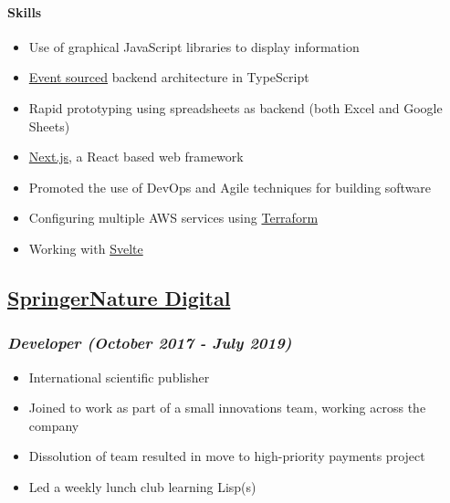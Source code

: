 \hypertarget{skills-0}{%
\paragraph{Skills}\label{skills-0}}

\begin{itemize}
\tightlist
\item
  Use of graphical JavaScript libraries to display information
\item
  \href{https://martinfowler.com/eaaDev/EventSourcing.html}{Event
  sourced} backend architecture in TypeScript
\item
  Rapid prototyping using spreadsheets as backend (both Excel and Google
  Sheets)
\item
  \href{https://nextjs.org/}{Next.js}, a React based web framework
\item
  Promoted the use of DevOps and Agile techniques for building software
\item
  Configuring multiple AWS services using
  \href{https://www.terraform.io/}{Terraform}
\item
  Working with \href{https://svelte.dev/}{Svelte}
\end{itemize}

\hypertarget{springernature-digital}{%
\subsection{\texorpdfstring{\href{http://www.springernature.com}{SpringerNature
Digital}}{SpringerNature Digital}}\label{springernature-digital}}

\hypertarget{developer-october-2017---june-2019}{%
\subsubsection{\texorpdfstring{\emph{Developer (October 2017 - July
2019)}}{Developer (October 2017 - July 2019)}}\label{developer-october-2017---june-2019}}

\begin{itemize}
\tightlist
\item
  International scientific publisher
\item
  Joined to work as part of a small innovations team, working across the
  company
\item
  Dissolution of team resulted in move to high-priority payments project
\item
  Led a weekly lunch club learning Lisp(s)
\end{itemize}

